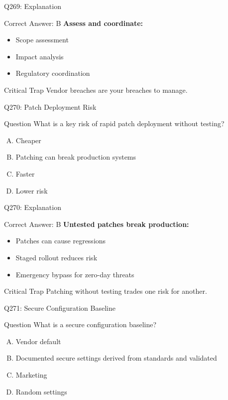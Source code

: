 \documentclass{beamer}
\begin{document}
	\begin{frame}{Q269: Explanation}
		\begin{block}{Correct Answer: B}
			\textbf{Assess and coordinate:}
			\begin{itemize}
				\item Scope assessment
				\item Impact analysis
				\item Regulatory coordination
			\end{itemize}
		\end{block}
		\begin{alertblock}{Critical Trap}
			Vendor breaches are your breaches to manage.
		\end{alertblock}
	\end{frame}
	
	\begin{frame}{Q270: Patch Deployment Risk}
		\begin{block}{Question}
			What is a key risk of rapid patch deployment without testing?
		\end{block}
		\begin{enumerate}[(A)]
			\item Cheaper
			\item Patching can break production systems
			\item Faster
			\item Lower risk
		\end{enumerate}
	\end{frame}
	
	\begin{frame}{Q270: Explanation}
		\begin{block}{Correct Answer: B}
			\textbf{Untested patches break production:}
			\begin{itemize}
				\item Patches can cause regressions
				\item Staged rollout reduces risk
				\item Emergency bypass for zero-day threats
			\end{itemize}
		\end{block}
		\begin{alertblock}{Critical Trap}
			Patching without testing trades one risk for another.
		\end{alertblock}
	\end{frame}
	
	\begin{frame}{Q271: Secure Configuration Baseline}
		\begin{block}{Question}
			What is a secure configuration baseline?
		\end{block}
		\begin{enumerate}[(A)]
			\item Vendor default
			\item Documented secure settings derived from standards and validated
			\item Marketing
			\item Random settings
		\end{enumerate}
	\end{frame}
	
\end{document}
